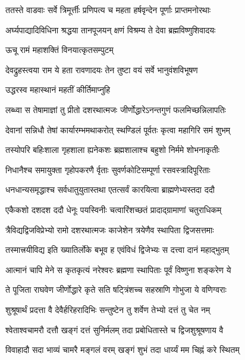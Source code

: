 \twolineshloka
{ततस्ते वाडवाः सर्वे त्रिमूर्त्तीः प्रणिपत्य च}
{महता हर्षवृन्देन पूर्णाः प्राप्तमनोरथाः}%

\twolineshloka
{अर्घ्यपाद्यादिविधिना श्रद्धया तानपूजयन्}
{क्षणं विश्रम्य ते देवा ब्रह्मविष्णुशिवादयः}%

\onelineshloka
{ऊचू रामं महाशक्तिं विनयात्कृतसम्पुटम्}%


\twolineshloka
{देवद्रुहस्त्वया राम ये हता रावणादयः}
{तेन तुष्टा वयं सर्वे भानुवंशविभूषण}%

\onelineshloka
{उद्धरस्व महास्थानं महतीं कीर्तिमाप्नुहि}%

\twolineshloka
{लब्ध्वा स तेषामाज्ञां तु प्रीतो दशरथात्मजः}
{जीर्णोद्धारेऽनन्तगुणं फलमिच्छन्निलापतिः}%

\twolineshloka
{देवानां सन्निधौ तेषां कार्यारम्भमथाकरोत्}
{स्थण्डिलं पूर्वतः कृत्वा महागिरि समं शुभम्}%

\twolineshloka
{तस्योपरि बहिःशाला गृहशाला ह्यनेकशः}
{ब्रह्मशालाश्च बहुशो निर्ममे शोभनाकृतीः}%

\twolineshloka
{निधानैश्च समायुक्ता गृहोपकरणै र्वृताः}
{सुवर्णकोटिसम्पूर्णा रसवस्त्रादिपूरिताः}%

\twolineshloka
{धनधान्यसमृद्धाश्च सर्वधातुयुतास्तथा}
{एतत्सर्वं कारयित्वा ब्राह्मणेभ्यस्तदा ददौ}%

\twolineshloka
{एकैकशो दशदश ददौ धेनूः पयस्विनीः}
{चत्वारिंशच्छतं प्रादाद्ग्रामाणां चतुराधिकम्}%

\twolineshloka
{त्रैविद्यद्विजविप्रेभ्यो रामो दशरथात्मजः}
{काजेशेन त्रयेणैव स्थापिता द्विजसत्तमाः}%

\twolineshloka
{तस्मात्त्रयीविद्य इति ख्यातिर्लोके बभूव ह}
{एवंविधं द्विजेभ्यः स दत्त्वा दानं महाद्भुतम्}%

\twolineshloka
{आत्मानं चापि मेने स कृतकृत्यं नरेश्वरः}
{ब्रह्मणा स्थापिताः पूर्वं विष्णुना शङ्करेण ये}%

\twolineshloka
{ते पूजिता राघवेण जीर्णोद्धारे कृते सति}
{षट्त्रिंशच्च सहस्राणि गोभुजा ये वणिग्वराः}%

\twolineshloka
{शुश्रूषार्थं प्रदत्ता वै देवैर्हरिहरादिभिः}
{सन्तुष्टेन तु शर्वेण तेभ्यो दत्तं तु चेत नम्}%

\twolineshloka
{श्वेताश्वचामरौ दत्तौ खङ्गं दत्तं सुनिर्मलम्}
{तदा प्रबोधितास्ते च द्विजशुश्रूषणाय वै}%

\twolineshloka
{विवाहादौ सदा भाव्यं चामरै मङ्गलं वरम्}
{खङ्गं शुभं तदा धार्य्यं मम चिह्नं करे स्थितम्}%

